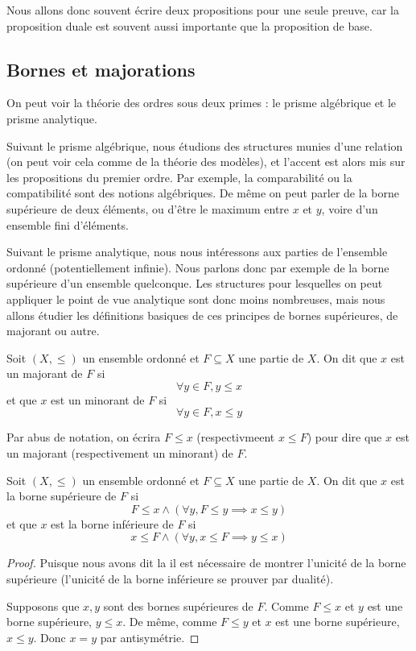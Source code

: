 Nous allons donc souvent écrire deux propositions pour une seule preuve, car la
proposition duale est souvent aussi importante que la proposition de base.

\subsection{Bornes et majorations}

On peut voir la théorie des ordres sous deux primes : le prisme algébrique et le
prisme analytique.

Suivant le prisme algébrique, nous étudions des structures
munies d'une relation (on peut voir cela comme de la théorie des modèles), et
l'accent est alors mis sur les propositions du premier ordre. Par exemple,
la comparabilité ou la compatibilité sont des notions algébriques. De même on
peut parler de la borne supérieure de deux éléments, ou d'être le maximum entre
$x$ et $y$, voire d'un ensemble fini d'éléments.

Suivant le prisme analytique, nous nous intéressons aux parties de l'ensemble
ordonné (potentiellement infinie). Nous parlons donc par exemple de la borne
supérieure d'un ensemble quelconque. Les structures pour lesquelles on peut
appliquer le point de vue analytique sont donc moins nombreuses, mais nous allons
étudier les définitions basiques de ces principes de bornes supérieures, de
majorant ou autre.

\begin{definition}
  Soit $(X,\leq)$ un ensemble ordonné et $F\subseteq X$ une partie de $X$. On
  dit que $x$ est un majorant de $F$ si
  \[\forall y\in F, y \leq x\]
  et que $x$ est un minorant de $F$ si
  \[\forall y\in F, x \leq y\]

  Par abus de notation, on écrira $F\leq x$ (respectivmeent $x\leq F$) pour dire
  que $x$ est un majorant (respectivement un minorant) de $F$.
\end{definition}

\begin{definition}
  Soit $(X,\leq)$ un ensemble ordonné et $F\subseteq X$ une partie de $X$. On
  dit que $x$ est la borne supérieure de $F$ si
  \[F\leq x \land (\forall y, F\leq y \implies x \leq y)\]
  et que $x$ est la borne inférieure de $F$ si
  \[x\leq F \land (\forall y, x\leq F \implies y \leq x)\]
\end{definition}

\begin{proof}
  Puisque nous avons dit \og la\fg{} il est nécessaire de montrer l'unicité de
  la borne supérieure (l'unicité de la borne inférieure se prouver par dualité).

  Supposons que $x,y$ sont des bornes supérieures de $F$. Comme $F\leq x$ et
  $y$ est une borne supérieure, $y\leq x$. De même, comme $F\leq y$ et $x$ est
  une borne supérieure, $x\leq y$. Donc $x = y$ par antisymétrie.
\end{proof}

